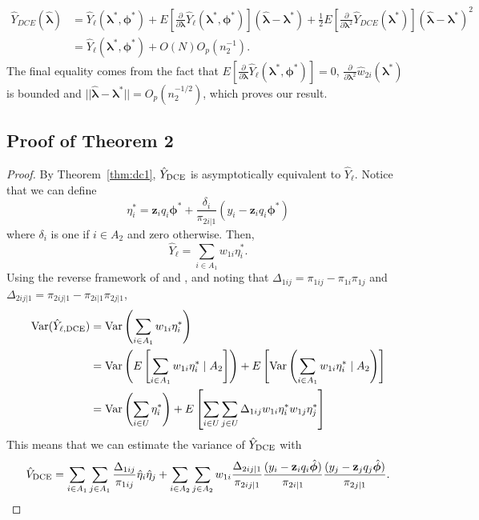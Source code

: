\documentclass[12pt]{article}
\newcommand{\Var}{{\text{Var}}}
\renewcommand{\bf}[1]{\mathbf{#1}}
\begin{document}
\begin{align*}
  \hat Y_{DCE}(\hat{\bm \lambda}) 
  &= \hat Y_\ell(\bm \lambda^*, \bm \phi^*) + 
  E\left[\frac{\partial}{\partial \bm \lambda}\hat Y_\ell(\bm \lambda^*,
  \bm \phi^*)\right](\hat{\bm \lambda} - \bm \lambda^*) + \frac{1}{2}
  E\left[\frac{\partial}{\partial \bm \lambda^2} \hat Y_{DCE}(\bm \lambda^*)\right] 
  (\hat{\bm \lambda} - \bm \lambda^*)^2\\
  &= \hat Y_\ell(\bm \lambda^*, \bm \phi^*) + O(N)O_p(n_2^{-1}).
\end{align*}
The final equality comes from the fact that 
$E\left[\frac{\partial}{\partial \bm \lambda}
\hat Y_\ell(\bm \lambda^*, \bm \phi^*)\right] = 0$,
$\frac{\partial}{\partial \bm \lambda^2} \hat w_{2i}(\bm \lambda^*)$ is
bounded and $||\hat{\bm \lambda} - \bm \lambda^*|| = O_p(n_2^{-1/2})$, which
proves our result.

\subsection{Proof of Theorem 2}

\begin{proof}
  By Theorem~\ref{thm:dc1}, $\hat Y_{\rm DCE}$ is asymptotically equivalent to
  $\hat Y_{\ell}$. Notice that we can define
  $$
  \eta_i^* = 
  \bf z_i q_i \bm \phi^* + \frac{\delta_i}{\pi_{2i|1}}(y_i - \bf z_i q_i \bm \phi^*)
  $$
  where $\delta_i$ is one if $i \in A_2$ and zero otherwise. Then,
  $$
  \hat Y_{\ell} = \sum_{i \in A_1} w_{1i} \eta_i^*.
  $$
  Using the reverse framework of \cite{fay1992inferences} and 
  \cite{shao1999variance}, and noting that 
  $\Delta_{1ij} = \pi_{1ij} - \pi_{1i}\pi_{1j}$ and 
  $\Delta_{2ij|1} = \pi_{2ij|1} - \pi_{2i|1}\pi_{2j|1}$,
  \begin{align*}
    \Var(\hat Y_{\ell, \rm{DCE}}) 
    &= \Var\left(\sum_{i \in A_1} w_{1i} \eta_i^*\right) \\
    &= \Var\left(E\left[\sum_{i \in A_1} w_{1i} \eta_i^* \mid A_2 \right]\right) 
    + E\left[\Var\left(\sum_{i \in A_1} w_{1i} \eta_i^* \mid A_2 \right)\right] \\
    &= \Var\left(\sum_{i \in U} \eta_i^*\right) 
    + E\left[\sum_{i \in U} \sum_{j \in U} \Delta_{1ij} w_{1i} \eta_i^* w_{1j}
      \eta_j^*\right]\\
  \end{align*}
  This means that we can estimate the variance of $\hat Y_{\rm DCE}$ with
  $$
  \hat V_{\rm DCE} 
  = \sum_{i \in A_1} \sum_{j \in A_1} \frac{\Delta_{1ij}}{\pi_{1ij}} 
  \hat \eta_i \hat \eta_j
  + \sum_{i \in A_2} \sum_{j \in A_2} w_{1i} \frac{\Delta_{2ij|1}}{\pi_{2ij|1}} 
  \frac{(y_i - \bf z_i q_i \hat{\bm \phi})}{\pi_{2i|1}}
  \frac{(y_j - \bf z_j q_j \hat{\bm \phi})}{\pi_{2j|1}}.
  $$
\end{proof}
\end{document}
